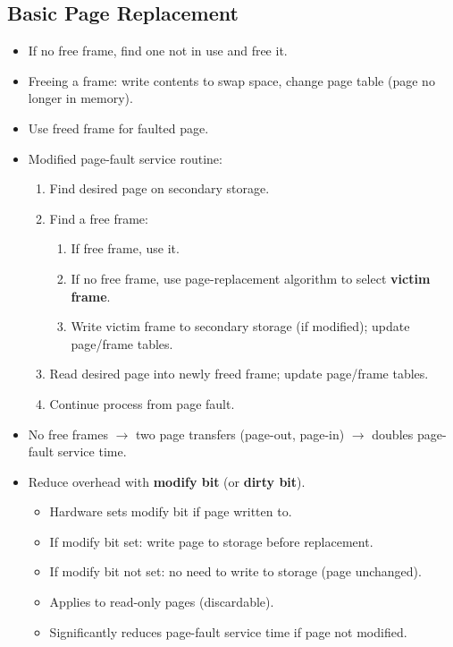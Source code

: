\subsection{Basic Page Replacement}
\begin{itemize}
    \item If no free frame, find one not in use and free it.
    \item Freeing a frame: write contents to swap space, change page table (page no longer in memory).
    \item Use freed frame for faulted page.
    \item Modified page-fault service routine:
    \begin{enumerate}
        \item Find desired page on secondary storage.
        \item Find a free frame:
        \begin{enumerate}
            \item If free frame, use it.
            \item If no free frame, use page-replacement algorithm to select \textbf{victim frame}.
            \item Write victim frame to secondary storage (if modified); update page/frame tables.
        \end{enumerate}
        \item Read desired page into newly freed frame; update page/frame tables.
        \item Continue process from page fault.
    \end{enumerate}
    \item No free frames $\rightarrow$ two page transfers (page-out, page-in) $\rightarrow$ doubles page-fault service time.
    \item Reduce overhead with \textbf{modify bit} (or \textbf{dirty bit}).
    \begin{itemize}
        \item Hardware sets modify bit if page written to.
        \item If modify bit set: write page to storage before replacement.
        \item If modify bit not set: no need to write to storage (page unchanged).
        \item Applies to read-only pages (discardable).
        \item Significantly reduces page-fault service time if page not modified.
    \end{itemize}

\end{itemize}
